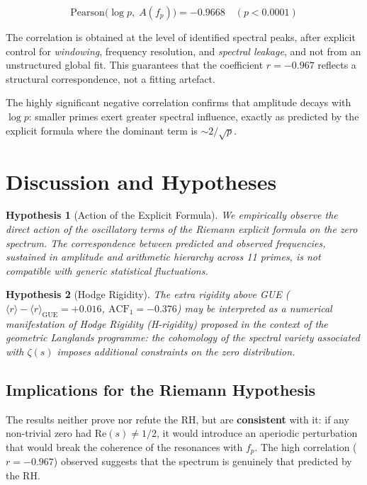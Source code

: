 \documentclass[12pt, a4paper]{article}
\newtheorem{hypothesis}{Hypothesis}
\begin{document}
\[
  \mathrm{Pearson}\bigl(\log p,\; A(f_p)\bigr) = -0.9668 \quad (p < 0.0001)
\]

The correlation is obtained at the level of identified spectral peaks,
after explicit control for \emph{windowing}, frequency resolution, and
\emph{spectral leakage}, and not from an unstructured global fit.
This guarantees that the coefficient $r = -0.967$ reflects a structural
correspondence, not a fitting artefact.

The highly significant negative correlation confirms that amplitude decays
with $\log p$: smaller primes exert greater spectral influence, exactly
as predicted by the explicit formula where the dominant term is
$\sim 2/\sqrt{p}$.

\section{Discussion and Hypotheses}

\begin{hypothesis}[Action of the Explicit Formula]
We empirically observe the direct action of the oscillatory terms of
the Riemann explicit formula on the zero spectrum. The correspondence
between predicted and observed frequencies, sustained in amplitude and
arithmetic hierarchy across 11 primes, is not compatible with generic
statistical fluctuations.
\end{hypothesis}

\begin{hypothesis}[Hodge Rigidity]
The extra rigidity above GUE ($\langle r\rangle - \langle r\rangle_{\mathrm{GUE}}
= +0.016$, $\mathrm{ACF}_1 = -0.376$) may be interpreted as a numerical
manifestation of \emph{Hodge Rigidity} (H-rigidity) proposed in
the context of the geometric Langlands programme: the cohomology of the
spectral variety associated with $\zeta(s)$ imposes additional constraints
on the zero distribution.
\end{hypothesis}

\subsection{Implications for the Riemann Hypothesis}

The results neither prove nor refute the RH, but are \textbf{consistent}
with it: if any non-trivial zero had $\mathrm{Re}(s) \neq 1/2$, it would
introduce an aperiodic perturbation that would break the coherence of
the resonances with $f_p$. The high correlation ($r = -0.967$) observed
suggests that the spectrum is genuinely that predicted by the RH.
\end{document}
